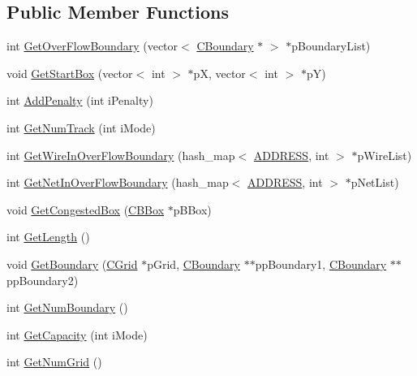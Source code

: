 \subsection*{Public Member Functions}
\begin{DoxyCompactItemize}
\item 
int \mbox{\hyperlink{classCLayer_aae29339458f6708296c4c05a36924760}{Get\+Over\+Flow\+Boundary}} (vector$<$ \mbox{\hyperlink{classCBoundary}{C\+Boundary}} $\ast$ $>$ $\ast$p\+Boundary\+List)
\item 
void \mbox{\hyperlink{classCLayer_a4b4499ed47902f08d9100e2c22d09144}{Get\+Start\+Box}} (vector$<$ int $>$ $\ast$pX, vector$<$ int $>$ $\ast$pY)
\item 
int \mbox{\hyperlink{classCLayer_a47bb48736ac93a95148807e67ec279f1}{Add\+Penalty}} (int i\+Penalty)
\item 
int \mbox{\hyperlink{classCLayer_a157ea79e4063c434c0c3df09dc9fd8cc}{Get\+Num\+Track}} (int i\+Mode)
\item 
int \mbox{\hyperlink{classCLayer_aa24a4614c4584721a8d10e43952c5af2}{Get\+Wire\+In\+Over\+Flow\+Boundary}} (hash\+\_\+map$<$ \mbox{\hyperlink{BoxRouter_8h_a280feb883e9d4a7edcc69c8bcb9f38f2}{A\+D\+D\+R\+E\+SS}}, int $>$ $\ast$p\+Wire\+List)
\item 
int \mbox{\hyperlink{classCLayer_a4d36fe6154f539a253380daf5ed0bedc}{Get\+Net\+In\+Over\+Flow\+Boundary}} (hash\+\_\+map$<$ \mbox{\hyperlink{BoxRouter_8h_a280feb883e9d4a7edcc69c8bcb9f38f2}{A\+D\+D\+R\+E\+SS}}, int $>$ $\ast$p\+Net\+List)
\item 
void \mbox{\hyperlink{classCLayer_aa4c718690f42ddb1adb4ace397264efc}{Get\+Congested\+Box}} (\mbox{\hyperlink{classCBBox}{C\+B\+Box}} $\ast$p\+B\+Box)
\item 
int \mbox{\hyperlink{classCLayer_a4e139423a04a8dd850ded7e9185c0a89}{Get\+Length}} ()
\item 
void \mbox{\hyperlink{classCLayer_a38b1b0ee3e7884ef63fd439070c37e17}{Get\+Boundary}} (\mbox{\hyperlink{classCGrid}{C\+Grid}} $\ast$p\+Grid, \mbox{\hyperlink{classCBoundary}{C\+Boundary}} $\ast$$\ast$pp\+Boundary1, \mbox{\hyperlink{classCBoundary}{C\+Boundary}} $\ast$$\ast$pp\+Boundary2)
\item 
int \mbox{\hyperlink{classCLayer_a402e96f6e8f284e145062e85caf73588}{Get\+Num\+Boundary}} ()
\item 
int \mbox{\hyperlink{classCLayer_a7e041ae4b69adbf606236ce0cd4f35a6}{Get\+Capacity}} (int i\+Mode)
\item 
int \mbox{\hyperlink{classCLayer_a94c6bfa99e46d919a415b00fd80964b3}{Get\+Num\+Grid}} ()

\end{DoxyCompactItemize}
